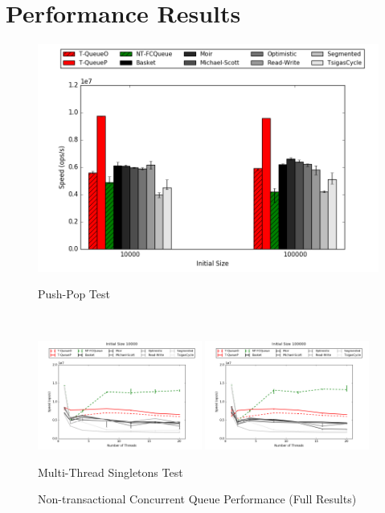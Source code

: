 \section{Performance Results}
\begin{figure}[H]
    \centering
	\begin{minipage}{0.5\textwidth}
    \centering
    \includegraphics[width=\textwidth]{concurrent/allQ:PushPop.png}
    \caption*{Push-Pop Test}
	\end{minipage}\\
    \begin{minipage}{\textwidth}
    \centering
    \includegraphics[width=0.48\textwidth]{concurrent/allQ:RandSingleOps10000.png}
    \includegraphics[width=0.48\textwidth]{concurrent/allQ:RandSingleOps100000.png}
    \caption*{Multi-Thread Singletons Test}
	\end{minipage}
    \caption{Non-transactional Concurrent Queue Performance (Full Results)}
\end{figure}

